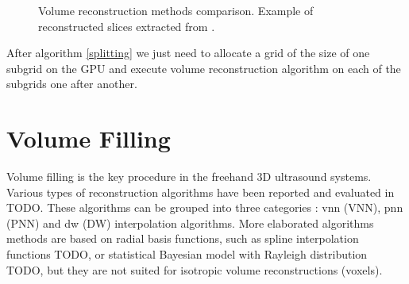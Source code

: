 \documentclass[12pt,journal,compsoc]{IEEEtran}
\begin{document}
\begin{figure}[hb!]
\centering
{}
\hfil
{}
\hfil
{}
\hfil
{}
\caption{Volume reconstruction methods comparison. Example of reconstructed slices extracted from \cite{2}.}
\label{algo_comparison}
\end{figure}


After algorithm \ref{splitting} we just need to allocate a grid of the size of one subgrid on the GPU and execute volume reconstruction algorithm on each of the subgrids one after another.

\section{Volume Filling}

Volume filling is the key procedure in the freehand 3D ultrasound systems. Various types of reconstruction algorithms have been reported and evaluated in TODO. These algorithms can be grouped into three categories : \acl{vnn} (VNN), \acl{pnn} (PNN) and \acl{dw} (DW) interpolation algorithms. 
More elaborated algorithms methods are based on radial basis functions, such as spline interpolation functions TODO, or statistical Bayesian model with Rayleigh distribution TODO, but they are not suited for isotropic volume reconstructions (voxels).\par
\end{document}
